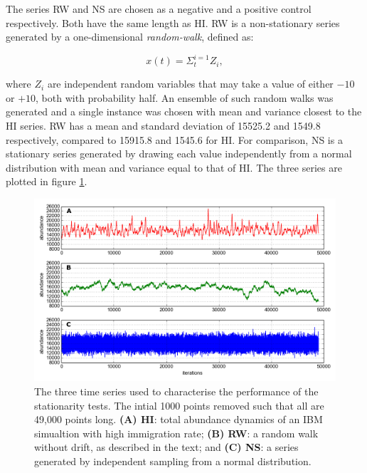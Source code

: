 The series RW and NS are chosen as a negative and a positive control respectively. Both have the same length as HI. RW is a non-stationary series generated by a one-dimensional \emph{random-walk}, defined as:

\begin{equation}
	x(t) = \Sigma_{t}^{i=1} Z_i, 
\end{equation}   

where $Z_i$ are independent random variables that may take a value of either $-10$ or $+10$, both with probability half. An ensemble of such random walks was generated and a single instance was chosen with mean and variance closest to the HI series. RW has a mean and standard deviation of 15525.2 and 1549.8 respectively, compared to 15915.8 and 1545.6 for HI. For comparison, NS is a stationary series generated by drawing each value independently from a normal distribution with mean and variance  equal to that of HI. The three series are plotted in figure \ref{fig:adf}.
  
  
\begin{figure}[ht]
	\centering
	\includegraphics[width=0.8\linewidth]{"./chapters/chapter04b/figures/hi_rw_ns_dynamics"}
     \caption{The three time series used to characterise the performance of the stationarity tests. The intial 1000 points removed such that all are 49,000 points long. \textbf{(A) HI}: total abundance dynamics of an IBM simualtion with high immigration rate; \textbf{(B) RW}: a random walk without drift, as described in the text; and \textbf{(C) NS}: a series generated by independent sampling from a normal distribution.} 
     \label{fig:adf}   
\end{figure}

